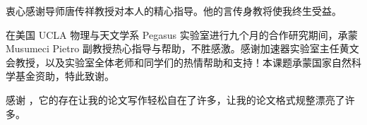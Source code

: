 \begin{acknowledgement}
  衷心感谢导师唐传祥教授对本人的精心指导。他的言传身教将使我终生受益。

  在美国 UCLA 物理与天文学系 Pegasus 实验室进行九个月的合作研究期间，承蒙 Musumeci Pietro 副教授热心指导与帮助，不胜感激。感谢加速器实验室主任黄文会教授，以及实验室全体老师和同学们的热情帮助和支持！本课题承蒙国家自然科学基金资助，特此致谢。

  感谢 \thuthesis，它的存在让我的论文写作轻松自在了许多，让我的论文格式规整漂亮了许多。
\end{acknowledgement}
